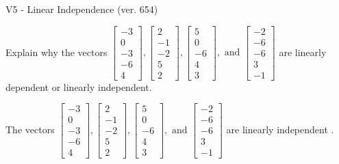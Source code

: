 \begin{exercise}
  \begin{exerciseTitle}V5 - Linear Independence (ver. 654)\end{exerciseTitle}
  \begin{exerciseStatement}
    Explain why the vectors \(\left[\begin{array}{r}
-3 \\
0 \\
-3 \\
-6 \\
4
\end{array}\right] , \left[\begin{array}{r}
2 \\
-1 \\
-2 \\
5 \\
2
\end{array}\right] , \left[\begin{array}{r}
5 \\
0 \\
-6 \\
4 \\
3
\end{array}\right] , \text{ and } \left[\begin{array}{r}
-2 \\
-6 \\
-6 \\
3 \\
-1
\end{array}\right]\) are linearly dependent or linearly independent.	


  \end{exerciseStatement}
  \begin{exerciseAnswer}
   The vectors \(\left[\begin{array}{r}
-3 \\
0 \\
-3 \\
-6 \\
4
\end{array}\right] , \left[\begin{array}{r}
2 \\
-1 \\
-2 \\
5 \\
2
\end{array}\right] , \left[\begin{array}{r}
5 \\
0 \\
-6 \\
4 \\
3
\end{array}\right] , \text{ and } \left[\begin{array}{r}
-2 \\
-6 \\
-6 \\
3 \\
-1
\end{array}\right]\) are 
  	 linearly independent  .
  


  \end{exerciseAnswer}
\end{exercise}